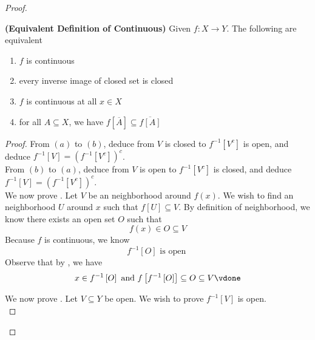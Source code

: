 \documentclass{report}
\begin{document}
\begin{proof}
\begin{theorem}
\label{2.4.4}
\textbf{(Equivalent Definition of Continuous)} Given $f:X\rightarrow Y$. The following are equivalent
\begin{enumerate}[label=(\alph*)]
  \item $f$ is continuous
  \item every inverse image of closed set is closed
  \item $f$ is continuous at all $x\in X$
  \item for all $A\subseteq X$, we have $f[\overline{A}]\subseteq \overline{f[A]}$
\end{enumerate}
\end{theorem}
\begin{proof}
From  $\left(a \right)$ to $\left(b \right)$, deduce from $V$ is closed to $f^{-1}\left[V^c \right]$ is open, and deduce $f^{-1}\left[V \right]=\left(f^{-1}\left[V^c \right] \right)^c$.\\

From $\left(b \right)$ to $\left(a \right)$, deduce from $V$ is open to $f^{-1}\left[V^c \right]$ is closed, and deduce $f^{-1}\left[V \right]=\left(f^{-1}\left[V^c \right] \right)^c$.\\

We now prove . Let $V$ be an neighborhood around $f\left(x \right)$. We wish to find an neighborhood $U$ around $x$ such that $f\left[U \right]\subseteq V$. By definition of neighborhood, we know there exists an open set $O$ such that
\begin{equation*}
  f\left(x \right)\in O\subseteq V
\end{equation*}
Because $f$ is continuous, we know 
\begin{equation*}
f^{-1}\left[O \right]\text{ is open }
\end{equation*}
Observe that by , we have
\begin{equation*}
x\in f^{-1}\left[O \right]\text{ and }f\left[f^{-1}\left[O \right] \right]\subseteq O\subseteq V\vdone
\end{equation*}


We now prove . Let $V\subseteq Y$ be open. We wish to prove $f^{-1}\left[V \right]$ is open.\\


\end{proof}
\end{proof}
\end{document}
